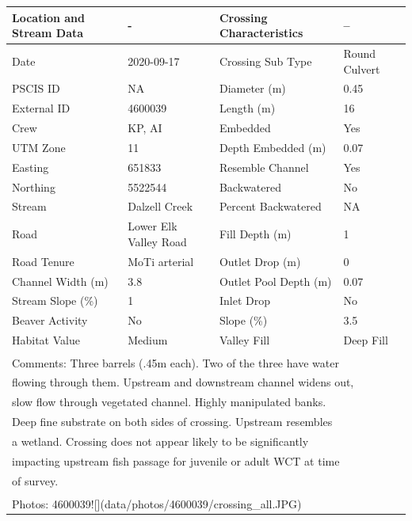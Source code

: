 \documentclass[
]{book}
\begin{document}
\begin{tabular}{l|l|l|l}
\hline
Location and Stream Data & - & Crossing Characteristics & --\\
\hline
Date & 2020-09-17 & Crossing Sub Type & Round Culvert\\
\hline
PSCIS ID & NA & Diameter (m) & 0.45\\
\hline
External ID & 4600039 & Length (m) & 16\\
\hline
Crew & KP, AI & Embedded & Yes\\
\hline
UTM Zone & 11 & Depth Embedded (m) & 0.07\\
\hline
Easting & 651833 & Resemble Channel & Yes\\
\hline
Northing & 5522544 & Backwatered & No\\
\hline
Stream & Dalzell Creek & Percent Backwatered & NA\\
\hline
Road & Lower Elk Valley Road & Fill Depth (m) & 1\\
\hline
Road Tenure & MoTi arterial & Outlet Drop (m) & 0\\
\hline
Channel Width (m) & 3.8 & Outlet Pool Depth (m) & 0.07\\
\hline
Stream Slope (\%) & 1 & Inlet Drop & No\\
\hline
Beaver Activity & No & Slope (\%) & 3.5\\
\hline
Habitat Value & Medium & Valley Fill & Deep Fill\\
\hline
\multicolumn{4}{l}{\textsuperscript{} Comments: Three barrels (.45m each). Two of the three have water}\\
\multicolumn{4}{l}{flowing through them. Upstream and downstream channel widens out,}\\
\multicolumn{4}{l}{slow flow through vegetated channel. Highly manipulated banks.}\\
\multicolumn{4}{l}{Deep fine substrate on both sides of crossing. Upstream resembles}\\
\multicolumn{4}{l}{a wetland. Crossing does not appear likely to be significantly}\\
\multicolumn{4}{l}{impacting upstream fish passage for juvenile or adult WCT at time}\\
\multicolumn{4}{l}{of survey.}\\
\multicolumn{4}{l}{\textsuperscript{} Photos: 4600039![](data/photos/4600039/crossing\_all.JPG)}\\
\end{tabular}
\end{document}
